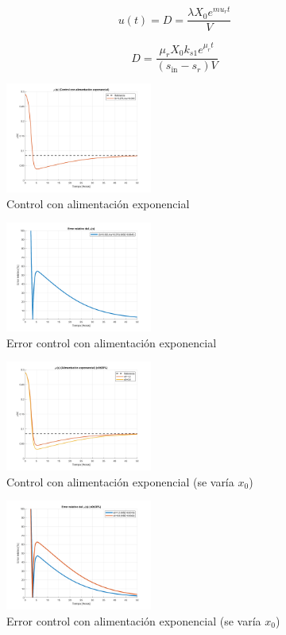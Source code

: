 \documentclass[letterpaper, 10 pt, conference]{ieeeconf}  %
\begin{document}
\begin{equation*}
  u(t) = D = \frac{\lambda X_0 e^{mu_{r}t}}{V}
\end{equation*}

\begin{equation}
D = \frac{\mu_r X_0 k_{s1} e^{\mu_r t}}{(s_{\text{in}} - s_r) V}
\end{equation}

\begin{figure}[H]
  \centering
  \includegraphics[width=0.43\textwidth]{./Images_tp3/exp.png}
  \caption{Control con alimentación exponencial}
\end{figure}
\begin{figure}[H]
  \centering
  \includegraphics[width=0.43\textwidth]{./Images_tp3/exp_err.png}
  \caption{Error control con alimentación exponencial}
\end{figure}
\begin{figure}[H]
  \centering
  \includegraphics[width=0.43\textwidth]{./Images_tp3/exp_x0.png}
  \caption{Control con alimentación exponencial (se varía $x_{0}$)}
\end{figure}
\begin{figure}[H]
  \centering
  \includegraphics[width=0.43\textwidth]{./Images_tp3/exp_err_x0.png}
  \caption{Error control con alimentación exponencial (se varía $x_{0}$)}
\end{figure}
\end{document}
